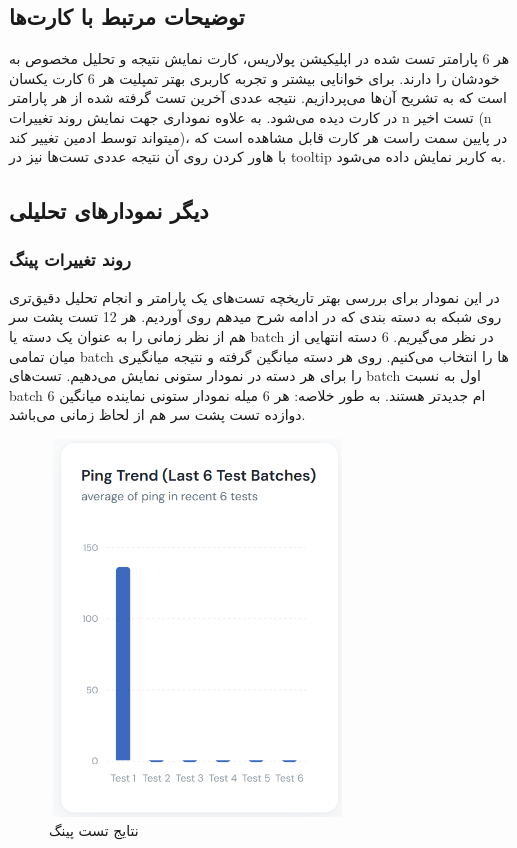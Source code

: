 \documentclass{report}
\begin{document}
\subsection{توضیحات مرتبط با کارت‌ها}
هر 6 پارامتر تست شده در اپلیکیشن پولاریس، کارت نمایش نتیجه و تحلیل مخصوص به خودشان را دارند. برای خوانایی بیشتر و تجربه کاربری بهتر تمپلیت هر 6 کارت یکسان است که به تشریح آن‌ها می‌پردازیم. نتیجه عددی آخرین تست گرفته شده از هر پارامتر در کارت دیده می‌شود. به علاوه نموداری جهت نمایش روند تغییرات n تست اخیر (n میتواند توسط ادمین تغییر کند)، در پایین سمت راست هر کارت قابل مشاهده است که با هاور کردن روی آن نتیجه عددی تست‌ها نیز در tooltip به کاربر نمایش داده می‌شود.

\subsection{دیگر نمودارهای تحلیلی}
\subsubsection{روند تغییرات پینگ}
در این نمودار برای بررسی بهتر تاریخچه تست‌های یک پارامتر و انجام تحلیل دقیق‌تری روی شبکه به دسته بندی که در ادامه شرح میدهم روی آوردیم.
هر 12 تست پشت سر هم از نظر زمانی را به عنوان یک دسته یا batch در نظر می‌گیریم. 6 دسته انتهایی از میان تمامی batch ها را انتخاب می‌کنیم. روی هر دسته میانگین گرفته و نتیجه میانگیری را برای هر دسته در نمودار ستونی نمایش می‌دهیم. تست‌های batch اول به نسبت batch 6 ام جدیدتر هستند. به طور خلاصه: هر 6 میله نمودار ستونی نماینده میانگین دوازده تست پشت سر هم از لحاظ زمانی می‌باشد.
 \begin{figure}[ht]
	\centering
	\includegraphics[width=0.7\textwidth,height=10cm,keepaspectratio]{Pic/ping}
	\caption{ نتایج تست پینگ}
	\label{fig:ping}
\end{figure}
\end{document}
